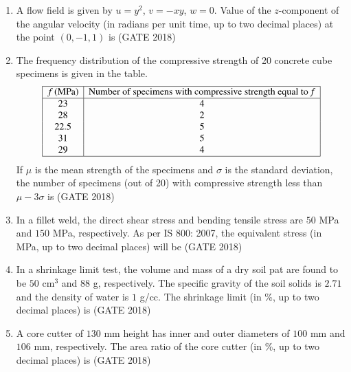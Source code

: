 \documentclass[journal,12pt,onecolumn]{IEEEtran}
\theoremstyle{remark}
\begin{document}
\begin{enumerate}
\vspace{1cm}
\item A flow field is given by $u = y^2$, $v = -xy$, $w = 0$. Value of the $z$-component of the angular velocity (in radians per unit time, up to two decimal places) at the point $(0,-1,1)$ is \underline{\hspace{3cm}} 
\hfill{(GATE 2018)}
\vspace{1cm}

\item The frequency distribution of the compressive strength of 20 concrete cube specimens is given in the table.
\[
\begin{array}{|c|c|}
\hline
f\,(\text{MPa}) & \text{Number of specimens with compressive strength equal to}\, f \\
\hline
23 & 4 \\
28 & 2 \\
22.5 & 5 \\
31 & 5 \\
29 & 4 \\
\hline
\end{array}
\]
If $\mu$ is the mean strength of the specimens and $\sigma$ is the standard deviation, the number of specimens (out of 20) with compressive strength less than $\mu - 3\sigma$ is \underline{\hspace{3cm}}
\hfill{(GATE 2018)}
\vspace{1cm}

\item In a fillet weld, the direct shear stress and bending tensile stress are $50$ MPa and $150$ MPa, respectively. As per IS 800: 2007, the equivalent stress (in MPa, up to two decimal places) will be \underline{\hspace{3cm}}
\hfill{(GATE 2018)}
\vspace{1cm}

\item In a shrinkage limit test, the volume and mass of a dry soil pat are found to be $50$ cm$^3$ and $88$ g, respectively. The specific gravity of the soil solids is $2.71$ and the density of water is $1$ g/cc. The shrinkage limit (in \%, up to two decimal places) is \underline{\hspace{3cm}}
\hfill{(GATE 2018)}
\vspace{1cm}

\item A core cutter of $130$ mm height has inner and outer diameters of $100$ mm and $106$ mm, respectively. The area ratio of the core cutter (in \%, up to two decimal places) is \underline{\hspace{3cm}}
\hfill{(GATE 2018)}
\vspace{1cm}


\end{enumerate}
\end{document}
